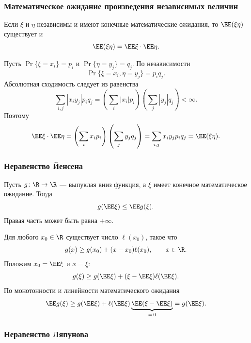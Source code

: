 \clearpage
\begingroup
\everymath{\textstyle}
\subsubsection{Математическое ожидание произведения независимых величин}

\begin{theorem}
    Если $\xi$ и $\eta$ независимы и имеют конечные математические
    ожидания, то $\EE(\xi\eta)$ существует и
    \[
        \EE(\xi\eta)=\EE\xi\cdot\EE\eta.
    \]
\end{theorem}

\begin{Proof}
    Пусть $\Pr\{\xi=x_i\}=p_i$ и $\Pr\{\eta=y_j\}=q_j$.
    По независимости
    \[
        \Pr\{\xi=x_i,\eta=y_j\}=p_iq_j.
    \]
    Абсолютная сходимость следует из равенства
    \[
        \sum_{i,j}|x_iy_j|p_iq_j
        =\left(\sum_i|x_i|p_i\right)
         \left(\sum_j|y_j|q_j\right)<\infty.
    \]
    Поэтому
    \[
        \EE\xi\cdot\EE\eta
        =\left(\sum_i x_ip_i\right)\left(\sum_j y_jq_j\right)
        =\sum_{i,j}x_iy_jp_iq_j=\EE(\xi\eta).
    \]
\end{Proof}

\subsubsection{Неравенство Йенсена}

\begin{theorem}
    Пусть $g\colon\R\to\R$ --- выпуклая вниз функция,
    а $\xi$ имеет конечное математическое ожидание. Тогда
    \[
        g(\EE\xi)\leq\EE g(\xi).
    \]
    Правая часть может быть равна $+\infty$.
\end{theorem}

\begin{Proof}
    Для любого $x_0\in\R$ существует число $\ell(x_0)$, такое что
    \[
        g(x)\geq g(x_0)+(x-x_0)\ell(x_0),\qquad x\in\R.
    \]
    Положим $x_0=\EE\xi$ и $x=\xi$:
    \[
        g(\xi)\geq g(\EE\xi)+(\xi-\EE\xi)\ell(\EE\xi).
    \]
    По монотонности и линейности математического ожидания
    \[
        \EE g(\xi)\geq g(\EE\xi)
        +\ell(\EE\xi)\underbrace{\EE(\xi-\EE\xi)}_{=\,0}
        =g(\EE\xi).
    \]
\end{Proof}

\newpage
\subsubsection{Неравенство Ляпунова}

